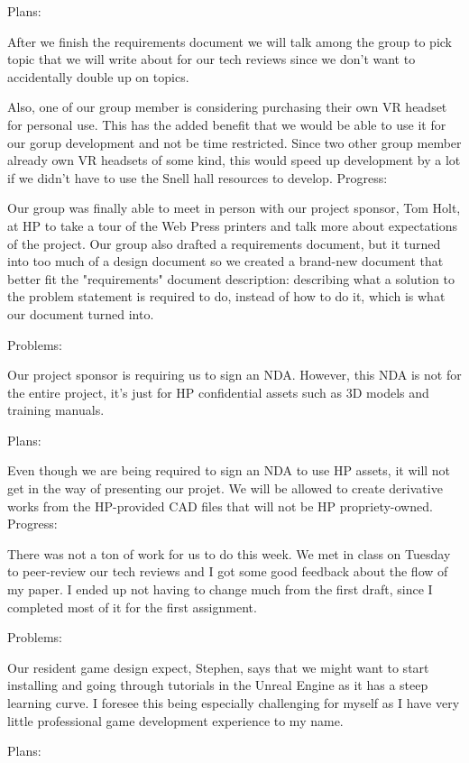 Plans:

After we finish the requirements document we will talk among the group to pick topic that we will write about for our tech reviews since we don't want to accidentally double up on topics.

Also, one of our group member is considering purchasing their own VR headset for personal use. This has the added benefit that we would be able to use it for our gorup development and not be time restricted. Since two other group member already own VR headsets of some kind, this would speed up development by a lot if we didn't have to use the Snell hall resources to develop.
Progress:

Our group was finally able to meet in person with our project sponsor, Tom Holt, at HP to take a tour of the Web Press printers and talk more about expectations of the project. Our group also drafted a requirements document, but it turned into too much of a design document so we created a brand-new document that better fit the "requirements" document description: describing what a solution to the problem statement is required to do, instead of how to do it, which is what our document turned into.

Problems:

Our project sponsor is requiring us to sign an NDA. However, this NDA is not for the entire project, it's just for HP confidential assets such as 3D models and training manuals.

Plans:

Even though we are being required to sign an NDA to use HP assets, it will not get in the way of presenting our projet. We will be allowed to create derivative works from the HP-provided CAD files that will not be HP propriety-owned.
Progress:

There was not a ton of work for us to do this week. We met in class on Tuesday to peer-review our tech reviews and I got some good feedback about the flow of my paper. I ended up not having to change much from the first draft, since I completed most of it for the first assignment.

Problems:

Our resident game design expect, Stephen, says that we might want to start installing and going through tutorials in the Unreal Engine as it has a steep learning curve. I foresee this being especially challenging for myself as I have very little professional game development experience to my name.

Plans:

